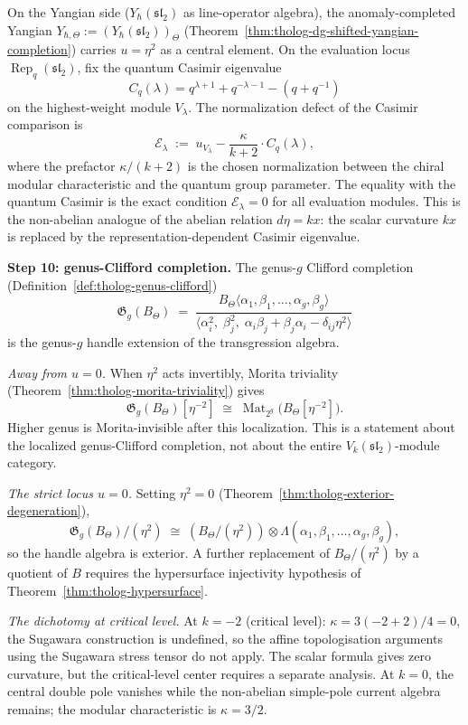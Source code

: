 \begin{construction}
On the Yangian side ($Y_\hbar(\mathfrak{sl}_2)$ as line-operator
algebra), the anomaly-completed Yangian
$Y_{\hbar,\Theta} := (Y_\hbar(\mathfrak{sl}_2))_\Theta$
(Theorem~\ref{thm:tholog-dg-shifted-yangian-completion})
carries $u = \eta^2$ as a central element. On the evaluation
locus $\operatorname{Rep}_q(\mathfrak{sl}_2)$, fix the quantum
Casimir eigenvalue
\[
C_q(\lambda)=q^{\lambda+1}+q^{-\lambda-1}-(q+q^{-1})
\]
on the highest-weight module \(V_\lambda\).  The normalization
defect of the Casimir comparison is
\begin{equation}\label{eq:su2-secondary-casimir}
\mathcal E_\lambda
\;:=\;
u_{V_\lambda}
-
\frac{\kappa}{k+2}
\cdot
C_q(\lambda),
\end{equation}
where the prefactor \(\kappa/(k+2)\) is the chosen normalization
between the chiral modular characteristic and the quantum group
parameter.  The equality with the quantum Casimir is the exact
condition \(\mathcal E_\lambda=0\) for all evaluation modules.  This
is the non-abelian analogue of the abelian relation \(d\eta=kx\):
the scalar curvature \(kx\) is replaced by the representation-dependent
Casimir eigenvalue.

\medskip
\noindent\textbf{Step 10: genus-Clifford completion.}
The genus-$g$ Clifford completion
(Definition~\ref{def:tholog-genus-clifford})
\[
\mathfrak G_g(B_\Theta)
\;=\;
\frac{B_\Theta\langle\alpha_1,\beta_1,\dots,\alpha_g,\beta_g\rangle}
{\langle\alpha_i^2,\;\beta_j^2,\;
\alpha_i\beta_j+\beta_j\alpha_i-\delta_{ij}\eta^2\rangle}
\]
is the genus-\(g\) handle extension of the transgression algebra.

\emph{Away from $u=0$.}
When $\eta^2$ acts invertibly, Morita triviality
(Theorem~\ref{thm:tholog-morita-triviality}) gives
\[
\mathfrak G_g(B_\Theta)[\eta^{-2}]
\;\cong\;
\operatorname{Mat}_{2^g}\bigl(B_\Theta[\eta^{-2}]\bigr).
\]
Higher genus is Morita-invisible after this localization. This is a
statement about the localized genus-Clifford completion, not about the
entire \(V_k(\mathfrak{sl}_2)\)-module category.

\emph{The strict locus $u=0$.}
Setting $\eta^2=0$ (Theorem~\ref{thm:tholog-exterior-degeneration}),
\[
\mathfrak G_g(B_\Theta)/(\eta^2)
\;\cong\;
(B_\Theta/(\eta^2))
\otimes
\Lambda(\alpha_1,\beta_1,\dots,\alpha_g,\beta_g),
\]
so the handle algebra is exterior.  A further replacement of
\(B_\Theta/(\eta^2)\) by a quotient of \(B\) requires the
hypersurface injectivity hypothesis of
Theorem~\ref{thm:tholog-hypersurface}.

\emph{The dichotomy at critical level.}
At $k=-2$ (critical level): $\kappa = 3(-2+2)/4 = 0$, the
Sugawara construction is undefined, so the affine topologisation
arguments using the Sugawara stress tensor do not apply.  The scalar
formula gives zero curvature, but the critical-level center requires a
separate analysis. At \(k=0\), the central double pole vanishes while
the non-abelian simple-pole current algebra remains; the modular
characteristic is \(\kappa=3/2\).


\end{construction}
